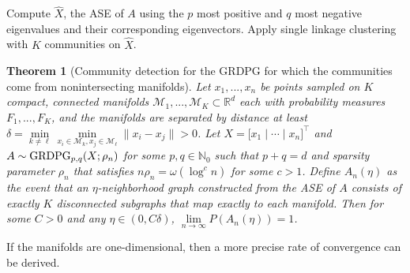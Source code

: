\documentclass[
  12pt,
]{article}
\newtheorem{theorem}{Theorem}[section]
\theoremstyle{definition}
\theoremstyle{definition}
\theoremstyle{definition}
\theoremstyle{definition}
\theoremstyle{remark}
\begin{document}
\begin{algorithm}[h]
\label{alg:ase-singlelink}
\DontPrintSemicolon
\SetAlgoLined
{}
Compute $\hat{X}$, the ASE of $A$ using the $p$ most positive and $q$ most negative eigenvalues and their corresponding eigenvectors.\;
Apply single linkage clustering with $K$ communities on $\hat{X}$.\;
\caption{ASE clustering for nonintersecting communities.}
\end{algorithm}

\begin{theorem}[Community detection for the GRDPG for which the communities come from nonintersecting manifolds]
\label{theorem:nonintersect-grdpg}
Let $x_1, ..., x_n$ be points sampled on $K$ compact, connected manifolds $\mathcal{M}_1, ..., \mathcal{M}_K \subset \mathbb{R}^d$ each with probability measures $F_1, ..., F_K$, and the manifolds are separated by distance at least $\delta = \min\limits_{k \neq \ell} \min\limits_{x_i \in \mathcal{M}_k, x_j \in \mathcal{M}_\ell} \| x_i - x_j \| > 0$. 
Let $X = \Big[ x_1 \mid \cdots \mid x_n \Big]^\top$ and $A \sim \mathrm{GRDPG}_{p,q}(X; \rho_n)$ for some $p, q \in \mathbb{N}_0$ such that $p + q = d$ and sparsity parameter $\rho_n$ that satisfies $n \rho_n = \omega(\log^c n)$ for some $c > 1$. 
Define $A_n(\eta)$ as the event that an $\eta$-neighborhood graph constructed from the ASE of $A$ consists of exactly $K$ disconnected subgraphs that map exactly to each manifold. 
Then for some $C > 0$ and any $\eta \in (0, C \delta)$, $\lim\limits_{n \to \infty} P(A_n(\eta)) = 1$. 
\end{theorem}

If the manifolds are one-dimensional, then a more precise rate of convergence can be derived.
\end{document}
